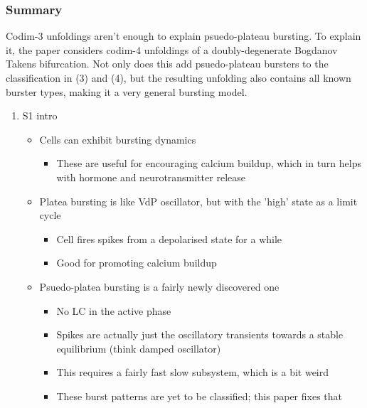 \documentclass[11pt]{article}
\begin{document}
\subsubsection{Summary}
\label{sec:orgcfe03f5}
Codim-3 unfoldings aren't enough to explain psuedo-plateau bursting.
To explain it, the paper considers codim-4 unfoldings of a doubly-degenerate Bogdanov Takens bifurcation.
Not only does this add psuedo-plateau bursters to the classification in (3) and (4), but the resulting unfolding also contains all known burster types, making it a very general bursting model.
\begin{enumerate}
\item S1 intro
\label{sec:org8a152dc}
\begin{itemize}
\item Cells can exhibit bursting dynamics
\begin{itemize}
\item These are useful for encouraging calcium buildup, which in turn helps with hormone and neurotransmitter release
\end{itemize}
\item Platea bursting is like VdP oscillator, but with the 'high' state as a limit cycle
\begin{itemize}
\item Cell fires spikes from a depolarised state for a while
\item Good for promoting calcium buildup
\end{itemize}
\item Psuedo-platea bursting is a fairly newly discovered one
\begin{itemize}
\item No LC in the active phase
\item Spikes are actually just the oscillatory transients towards a stable equilibrium (think damped oscillator)
\item This requires a fairly fast slow subsystem, which is a bit weird
\item These burst patterns are yet to be classified; this paper fixes that
\end{itemize}
\end{itemize}


\end{enumerate}
\end{document}

